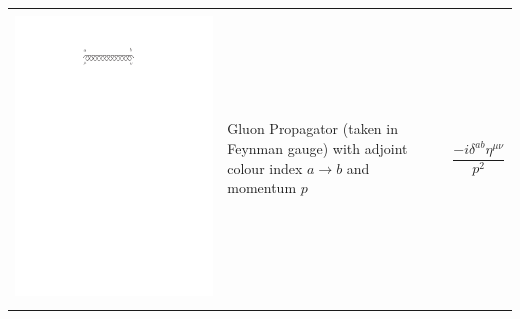 \begin{table}[h!]
\begin{tabular}{ | c | m{5cm} | m{5cm} | }
\begin{minipage}{5cm}
    \end{minipage}
    \\ [\VSpace]
	\begin{minipage}{.3\textwidth}
      \includegraphics[scale=0.7]{Images/gluon_prop.pdf}
    \end{minipage}
    &
    Gluon Propagator (taken in Feynman gauge) with adjoint colour index $a \to b$ and momentum $p$
    & 
    \begin{minipage}{5cm}
    \centering
     $$\frac{-i \delta^{ab} \eta^{\mu \nu}}{p^2}$$
    \end{minipage}
    \\ [\VSpace]
    	\begin{minipage}{.3\textwidth}

\end{minipage}
\end{tabular}
\end{table}
